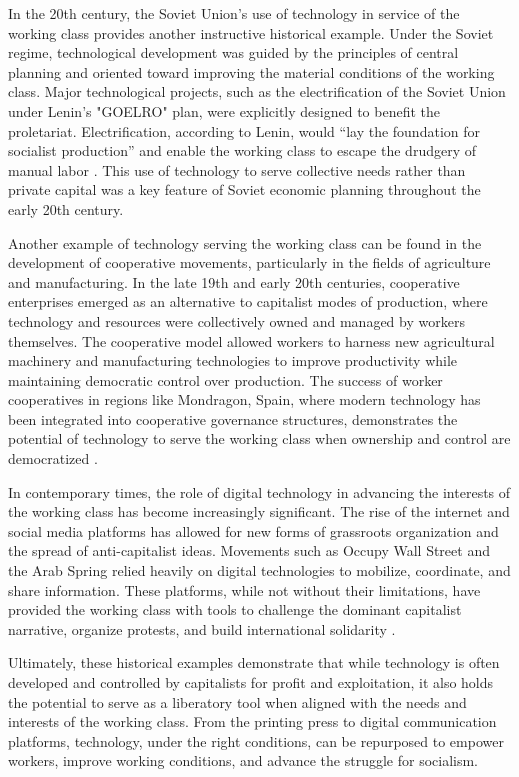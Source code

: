 \begin{refsection}
In the 20th century, the Soviet Union's use of technology in service of the working class provides another instructive historical example. Under the Soviet regime, technological development was guided by the principles of central planning and oriented toward improving the material conditions of the working class. Major technological projects, such as the electrification of the Soviet Union under Lenin's "GOELRO" plan, were explicitly designed to benefit the proletariat. Electrification, according to Lenin, would “lay the foundation for socialist production” and enable the working class to escape the drudgery of manual labor \cite[pp.~42-43]{lenin1920}. This use of technology to serve collective needs rather than private capital was a key feature of Soviet economic planning throughout the early 20th century.

Another example of technology serving the working class can be found in the development of cooperative movements, particularly in the fields of agriculture and manufacturing. In the late 19th and early 20th centuries, cooperative enterprises emerged as an alternative to capitalist modes of production, where technology and resources were collectively owned and managed by workers themselves. The cooperative model allowed workers to harness new agricultural machinery and manufacturing technologies to improve productivity while maintaining democratic control over production. The success of worker cooperatives in regions like Mondragon, Spain, where modern technology has been integrated into cooperative governance structures, demonstrates the potential of technology to serve the working class when ownership and control are democratized \cite[pp.~69-71]{whyte1991}.

In contemporary times, the role of digital technology in advancing the interests of the working class has become increasingly significant. The rise of the internet and social media platforms has allowed for new forms of grassroots organization and the spread of anti-capitalist ideas. Movements such as Occupy Wall Street and the Arab Spring relied heavily on digital technologies to mobilize, coordinate, and share information. These platforms, while not without their limitations, have provided the working class with tools to challenge the dominant capitalist narrative, organize protests, and build international solidarity \cite[pp.~115-116]{castells2012}.

Ultimately, these historical examples demonstrate that while technology is often developed and controlled by capitalists for profit and exploitation, it also holds the potential to serve as a liberatory tool when aligned with the needs and interests of the working class. From the printing press to digital communication platforms, technology, under the right conditions, can be repurposed to empower workers, improve working conditions, and advance the struggle for socialism.


\end{refsection}
